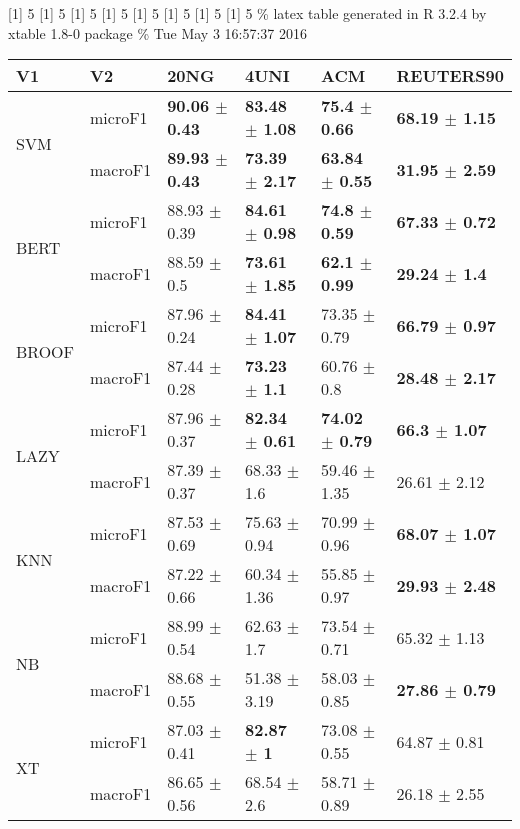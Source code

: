 \documentclass[]{article}
\begin{document}
{[}1{]} 5 {[}1{]} 5 {[}1{]} 5 {[}1{]} 5 {[}1{]} 5 {[}1{]} 5 {[}1{]} 5
{[}1{]} 5 \% latex table generated in R 3.2.4 by xtable 1.8-0 package \%
Tue May 3 16:57:37 2016

\begin{table}[ht]
\centering
\begin{tabular}{llllll}
  \hline
V1 & V2 & 20NG & 4UNI & ACM & REUTERS90 \\ 
  \cline{3-6} \hline
\multirow{2}{*}{SVM} & microF1 & \bf{90.06 $\pm$  0.43} & \bf{83.48 $\pm$  1.08} & \bf{75.4 $\pm$  0.66} & \bf{68.19 $\pm$  1.15} \\ 
   & macroF1 & \bf{89.93 $\pm$  0.43} & \bf{73.39 $\pm$  2.17} & \bf{63.84 $\pm$  0.55} & \bf{31.95 $\pm$  2.59} \\ 
   \cline{3-6}\multirow{2}{*}{BERT} & microF1 & 88.93 $\pm$  0.39 & \bf{84.61 $\pm$  0.98} & \bf{74.8 $\pm$  0.59} & \bf{67.33 $\pm$  0.72} \\ 
   & macroF1 & 88.59 $\pm$  0.5 & \bf{73.61 $\pm$  1.85} & \bf{62.1 $\pm$  0.99} & \bf{29.24 $\pm$  1.4} \\ 
   \cline{3-6}\multirow{2}{*}{BROOF} & microF1 & 87.96 $\pm$  0.24 & \bf{84.41 $\pm$  1.07} & 73.35 $\pm$  0.79 & \bf{66.79 $\pm$  0.97} \\ 
   & macroF1 & 87.44 $\pm$  0.28 & \bf{73.23 $\pm$  1.1} & 60.76 $\pm$  0.8 & \bf{28.48 $\pm$  2.17} \\ 
   \cline{3-6}\multirow{2}{*}{LAZY} & microF1 & 87.96 $\pm$  0.37 & \bf{82.34 $\pm$  0.61} & \bf{74.02 $\pm$  0.79} & \bf{66.3 $\pm$  1.07} \\ 
   & macroF1 & 87.39 $\pm$  0.37 & 68.33 $\pm$  1.6 & 59.46 $\pm$  1.35 & 26.61 $\pm$  2.12 \\ 
   \cline{3-6}\multirow{2}{*}{KNN} & microF1 & 87.53 $\pm$  0.69 & 75.63 $\pm$  0.94 & 70.99 $\pm$  0.96 & \bf{68.07 $\pm$  1.07} \\ 
   & macroF1 & 87.22 $\pm$  0.66 & 60.34 $\pm$  1.36 & 55.85 $\pm$  0.97 & \bf{29.93 $\pm$  2.48} \\ 
   \cline{3-6}\multirow{2}{*}{NB} & microF1 & 88.99 $\pm$  0.54 & 62.63 $\pm$  1.7 & 73.54 $\pm$  0.71 & 65.32 $\pm$  1.13 \\ 
   & macroF1 & 88.68 $\pm$  0.55 & 51.38 $\pm$  3.19 & 58.03 $\pm$  0.85 & \bf{27.86 $\pm$  0.79} \\ 
   \cline{3-6}\multirow{2}{*}{XT} & microF1 & 87.03 $\pm$  0.41 & \bf{82.87 $\pm$  1} & 73.08 $\pm$  0.55 & 64.87 $\pm$  0.81 \\ 
   & macroF1 & 86.65 $\pm$  0.56 & 68.54 $\pm$  2.6 & 58.71 $\pm$  0.89 & 26.18 $\pm$  2.55 \\ 

\end{tabular}
\end{table}
\end{document}
